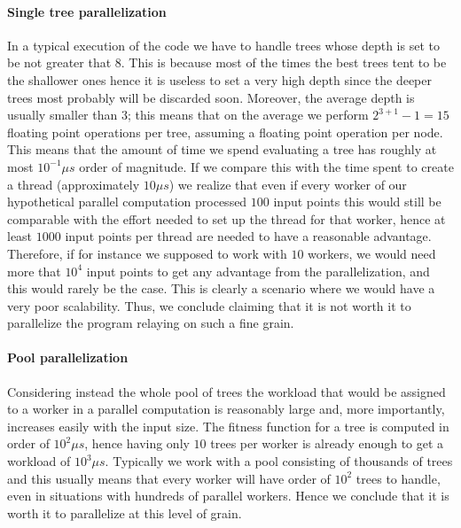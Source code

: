 \documentclass[10pt]{article}
\numberwithin{equation}{section}
\begin{document}
\paragraph{Single tree parallelization}
In a typical execution of the code we have to handle trees whose depth is set to be not greater that $8$. This is because most of the times the best trees tent to be the shallower ones hence it is useless to set a very high depth since the deeper trees most probably will be discarded soon. Moreover, the average depth is usually smaller than $3$; this means that on the average we perform $2^{3+1}-1=15$ floating point operations per tree, assuming a floating point operation per node. This means that the amount of time we spend evaluating a tree has roughly at most $10^{-1}\mu$$s$ order of magnitude. If we compare this with the time spent to create a thread (approximately $10\mu$$s$) we realize that even if every worker of our hypothetical parallel computation processed $100$ input points this would still be comparable with the effort needed to set up the thread for that worker, hence at least $1000$ input points per thread are needed to have a reasonable advantage. Therefore, if for instance we supposed to work with $10$ workers, we would need more that $10^{4}$ input points to get any advantage from the parallelization, and this would rarely be the case. This is clearly a scenario where we would have a very poor scalability. Thus, we conclude claiming that it is not worth it to parallelize the program relaying on such a fine grain.
\paragraph{Pool parallelization}
Considering instead the whole pool of trees the workload that would be assigned to a worker in a parallel computation is reasonably large and, more importantly, increases easily with the input size. The fitness function for a tree is computed in order of $10^{2}\mu$$s$, hence having only $10$ trees per worker is already enough to get a workload of $10^{3}\mu$$s$. Typically we work with a pool consisting of thousands of trees and this usually means that every worker will have order of $10^{2}$ trees to handle, even in situations with hundreds of parallel workers. Hence we conclude that it is worth it to parallelize at this level of grain.
\end{document}
